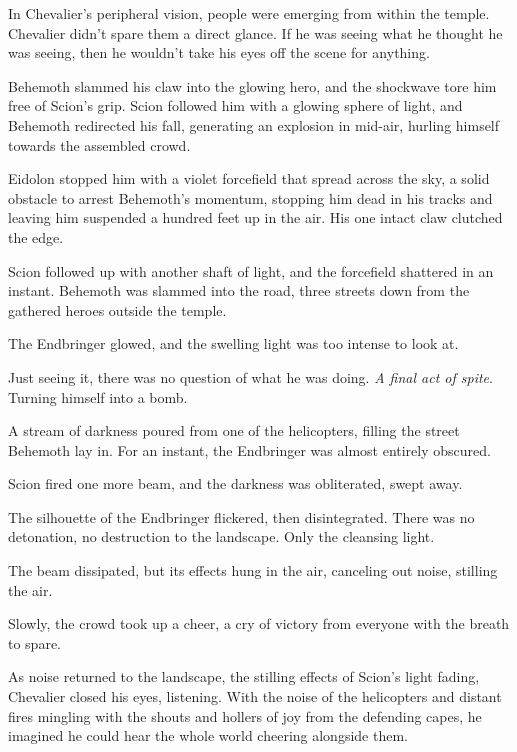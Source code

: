 In Chevalier's peripheral vision, people were emerging from within the temple.  Chevalier didn't spare them a direct glance.  If he was seeing what he thought he was seeing, then he wouldn't take his eyes off the scene for anything.



Behemoth slammed his claw into the glowing hero, and the shockwave tore him free of Scion's grip.  Scion followed him with a glowing sphere of light, and Behemoth redirected his fall, generating an explosion in mid-air, hurling himself towards the assembled crowd.



Eidolon stopped him with a violet forcefield that spread across the sky, a solid obstacle to arrest Behemoth's momentum, stopping him dead in his tracks and leaving him suspended a hundred feet up in the air.  His one intact claw clutched the edge.



Scion followed up with another shaft of light, and the forcefield shattered in an instant.  Behemoth was slammed into the road, three streets down from the gathered heroes outside the temple.



The Endbringer glowed, and the swelling light was too intense to look at.



Just seeing it, there was no question of what he was doing.  \emph{A final act of spite}.  Turning himself into a bomb.



A stream of darkness poured from one of the helicopters, filling the street Behemoth lay in.  For an instant, the Endbringer was almost entirely obscured.



Scion fired one more beam, and the darkness was obliterated, swept away.



The silhouette of the Endbringer flickered, then disintegrated.  There was no detonation, no destruction to the landscape.  Only the cleansing light.



The beam dissipated, but its effects hung in the air, canceling out noise, stilling the air.



Slowly, the crowd took up a cheer, a cry of victory from everyone with the breath to spare.



As noise returned to the landscape, the stilling effects of Scion's light fading, Chevalier closed his eyes, listening.  With the noise of the helicopters and distant fires mingling with the shouts and hollers of joy from the defending capes, he imagined he could hear the whole world cheering alongside them.





